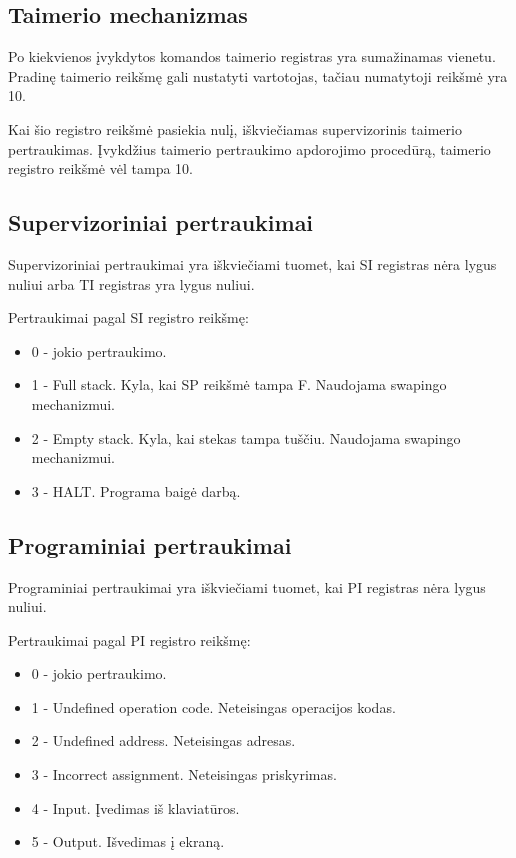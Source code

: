 \documentclass[12pt]{article}
\begin{document}
	\subsection{Taimerio mechanizmas}
	Po kiekvienos įvykdytos komandos taimerio registras yra sumažinamas vienetu. Pradinę taimerio reikšmę gali nustatyti vartotojas, tačiau numatytoji reikšmė yra 10.
	
	Kai šio registro reikšmė pasiekia nulį, iškviečiamas supervizorinis taimerio pertraukimas. Įvykdžius taimerio pertraukimo apdorojimo procedūrą, taimerio registro reikšmė vėl tampa 10.
	
	\subsection{Supervizoriniai pertraukimai}
	Supervizoriniai pertraukimai yra iškviečiami tuomet, kai SI registras nėra lygus nuliui arba TI registras yra lygus nuliui.
	
	Pertraukimai pagal SI registro reikšmę:
	\begin{itemize}
	\item 0 - jokio pertraukimo.
	\item 1 - Full stack. Kyla, kai SP reikšmė tampa F. Naudojama swapingo mechanizmui.
	\item 2 - Empty stack. Kyla, kai stekas tampa tuščiu. Naudojama swapingo mechanizmui.
	\item 3 - HALT. Programa baigė darbą. 
	\end{itemize}
	
	\subsection{Programiniai pertraukimai}
	Programiniai pertraukimai yra iškviečiami tuomet, kai PI registras nėra lygus nuliui.
	
	Pertraukimai pagal PI registro reikšmę:
	\begin{itemize}
	\item 0 - jokio pertraukimo.
	\item 1 - Undefined operation code. Neteisingas operacijos kodas.
	\item 2 - Undefined address. Neteisingas adresas.
	\item 3 - Incorrect assignment. Neteisingas priskyrimas.
	\item 4 - Input. Įvedimas iš klaviatūros.
	\item 5 - Output. Išvedimas į ekraną.
	\end{itemize}
	
\end{document}
